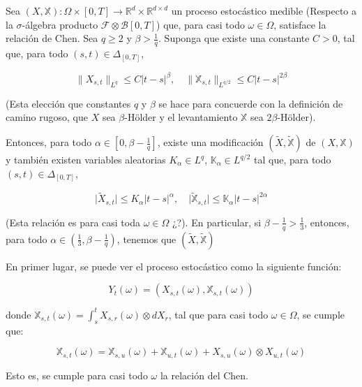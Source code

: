 \begin{theorem}

Sea $(X, \mathbb{X}): \Omega \times [0, T] \rightarrow \mathbb{R}^d \times \mathbb{R}^{d \times d}$ un proceso estocástico medible (Respecto a la $\sigma$-álgebra producto $\mathcal{F} \otimes \mathcal{B}[0, T]$) que, para casi todo $\omega \in \Omega$, satisface la relación de Chen. Sea $q \geq 2$ y $\beta > \frac{1}{q}$. Suponga que existe una constante $C > 0$, tal que, para todo $(s,t)\in \Delta_{[0,T]} $,

\[
	\lVert X_{s,t} \rVert_{L^q} \leq C \lvert t-s \rvert^{\beta}, \quad \lVert \mathbb{X}_{s,t} \rVert_{L^{q/2}} \leq C \lvert t - s \rvert^{2\beta}
\]

(Esta elección que constantes $q$ y $\beta$ se hace para concuerde con la definición de camino rugoso, que $X$ sea $\beta$-Hölder y el levantamiento $\mathbb{X}$ sea $2\beta$-Hölder).

Entonces, para todo $\alpha \in [0, \beta - \frac{1}{q}]$, existe una modificación $(\tilde{X}, \tilde{\mathbb{X}})$ de $(X, \mathbb{X})$ y también existen variables aleatorias $K_{\alpha} \in L^q$, $\mathbb{K}_{\alpha} \in L^{q/2}$ tal que, para todo $(s,t) \in \Delta_{[0,T]}$,

\[
	\lvert \tilde{X}_{s,t} \rvert \leq K_{\alpha} \lvert t - s \rvert^{\alpha}, \quad \lvert \tilde{ \mathbb{X} }_{s,t} \rvert \leq \mathbb{K}_{\alpha} \lvert t - s \rvert^{2\alpha}
\]

(Esta relación es para casi toda $\omega \in \Omega$ ¿?). En particular, si $\beta - \frac{1}{q} > \frac{1}{3}$, entonces, para todo $\alpha \in (\frac{1}{3}, \beta - \frac{1}{q})$, tenemos que $(\tilde{X}, \tilde{\mathbb{X}})$

\end{theorem}

En primer lugar, se puede ver el proceso estocástico como la siguiente función:

\[
	Y_t (\omega) = (X_{s,t} (\omega), \mathbb{X}_{s,t} (\omega) )
\]

donde $\mathbb{X}_{s,t} (\omega) = \int_s^t X_{s,r} (\omega) \otimes dX_{r}$, tal que para casi todo $\omega \in \Omega$, se cumple que:

\[
	\mathbb{X}_{s,t} (\omega) = \mathbb{X}_{s,u} (\omega) + \mathbb{X}_{u,t} (\omega) + X_{s,u} (\omega) \otimes X_{u,t} (\omega)
\]

Esto es, se cumple para casi todo $\omega$ la relación del Chen.

